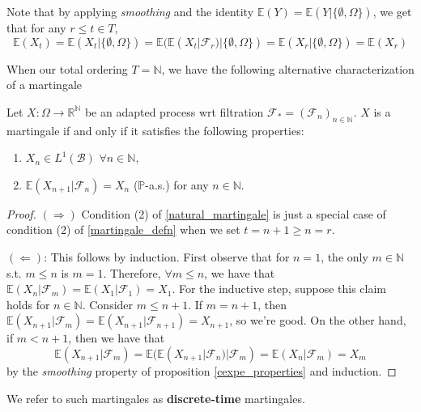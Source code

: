 Note that by applying \textit{smoothing} and the identity \(\mathbb{E}(Y) = \mathbb{E}(Y|\{\emptyset, \Omega\})\), we get that for any \(r \leq t \in T\), 
\[\mathbb{E}(X_{t}) = \mathbb{E}(X_{t} | \{\emptyset, \Omega\}) = \mathbb{E}(\mathbb{E}(X_{t} | \mathcal{F}_{r})|\{\emptyset, \Omega\}) = \mathbb{E}(X_{r}|\{\emptyset, \Omega\}) = \mathbb{E}(X_{r})\]

When our total ordering \(T = \mathbb{N}\), we have the following alternative characterization of a martingale
\begin{proposition}
    \label{natural_martingale}
    Let $X: \Omega \to \mathbb{R}^{\mathbb{N}}$ be an adapted process wrt filtration $\mathcal{F}_{*} = (\mathcal{F}_{n})_{n \in \mathbb{N}}$. $X$ is a martingale if and only if it satisfies the following properties:
    \begin{enumerate}
        \item $X_{n} \in L^{1}(\mathcal{B})$ $\forall n \in \mathbb{N}$,
        \item $\mathbb{E}(X_{n+1} | \mathcal{F}_{n}) = X_{n}$ (\(\mathbb{P}\)-a.s.) for any $n \in \mathbb{N}$.
    \end{enumerate}
\end{proposition}

\begin{proof}
    \((\Rightarrow)\) Condition (2) of \ref{natural_martingale} is just a special case of condition (2) of \ref{martingale_defn} when we set \(t = n+1 \geq n = r\).

    \((\Leftarrow)\): This follows by induction. First observe that for $n = 1$, the only $m \in \mathbb{N}$ s.t. $m \leq n$ is $m = 1$. Therefore, $\forall m \leq n$, we have that $\mathbb{E}(X_{n} | \mathcal{F}_{m}) = \mathbb{E}(X_{1} | \mathcal{F}_{1}) = X_{1}$. For the inductive step, suppose this claim holds for $n \in \mathbb{N}$. Consider $m \leq n+1$. If \(m = n+1\), then \(\mathbb{E}(X_{n+1} | \mathcal{F}_{m}) = \mathbb{E}(X_{n+1} | \mathcal{F}_{n+1}) = X_{n+1}\), so we're good. On the other hand, if \(m < n+1\), then we have that $$\mathbb{E}(X_{n+1} | \mathcal{F}_{m}) = \mathbb{E}(\mathbb{E}(X_{n+1} | \mathcal{F}_{n}) | \mathcal{F}_{m}) = \mathbb{E}(X_{n} | \mathcal{F}_{m}) = X_{m}$$ by the \textit{smoothing} property of proposition \ref{cexpe_properties} and induction.
\end{proof}

We refer to such martingales as \textbf{discrete-time} martingales.


